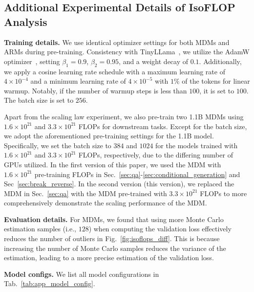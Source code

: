 \documentclass{article} %
\begin{document}
\subsection{Additional Experimental Details of IsoFLOP Analysis}
\label{app:sec_details_isoflops}
\textbf{Training details.} We use identical optimizer settings for both MDMs and ARMs during pre-training. Consistency with TinyLLama~\citep{zhang2024tinyllama}, we utilize the AdamW optimizer~\citep{loshchilov2017decoupled}, setting $\beta_1=0.9$, $\beta_2=0.95$, and a weight decay of $0.1$. Additionally, we apply a cosine learning rate schedule with a maximum learning rate of $4 \times 10^{-4}$ and a minimum learning rate of $4 \times 10^{-5}$ with $1 \%$ of the tokens for linear warmup. Notably, if the number of warmup steps is less than $100$, it is set to $100$. The batch size is set to $256$. 

Apart from the scaling law experiment, we also pre-train two 1.1B MDMs using $1.6 \times 10^{21}$ and $3.3 \times 10^{21}$ FLOPs for downstream tasks. Except for the batch size, we adopt the aforementioned pre-training settings for the 1.1B model. Specifically, we set the batch size to $384$ and $1024$ for the models trained with $1.6 \times 10^{21}$ and $3.3 \times 10^{21}$ FLOPs, respectively, due to the differing number of GPUs utilized. In the first version of this paper, we used the MDM with $1.6 \times 10^{21}$ pre-training FLOPs in Sec.~\ref{sec:qa}-\ref{sec:conditional_generation} and Sec~\ref{sec:break_reverse}. In the second version (this version), we replaced the MDM in Sec.~\ref{sec:qa} with the MDM pre-trained with $3.3 \times 10^{21}$ FLOPs to more comprehensively demonstrate the scaling performance of the MDM.

\textbf{Evaluation details.} For MDMs, we found that using more Monte Carlo estimation samples (i.e., $128$) when computing the validation loss effectively reduces the number of outliers in Fig.~\ref{fig:isoflops_diff}. This is because increasing the number of Monte Carlo samples reduces the variance of the estimation, leading to a more precise estimation of the validation loss.

\textbf{Model configs.} We list all model  configurations in Tab.~\ref{tab:app_model_config}.
\end{document}
